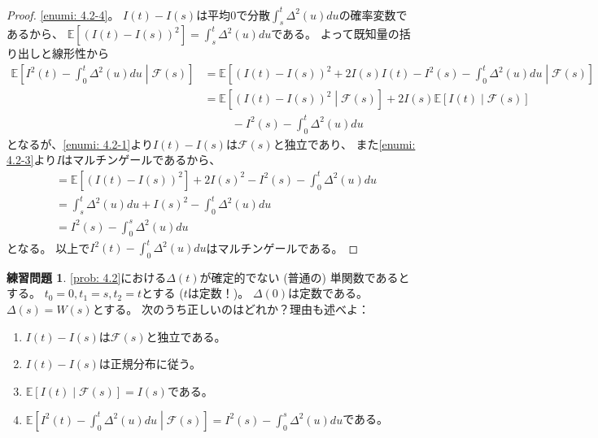 \documentclass[uplatex]{jsarticle}
\theoremstyle{definition}
\newtheorem{prob}[prob]{練習問題}
\def\E{\mathbb{E}}
\def\mcF{\mathcal{F}}
\begin{document}
\begin{proof}
  \ref{enumi: 4.2-4}。
  \(I(t)-I(s)\)は平均\(0\)で分散\(\int_s^t\Delta^2(u)du\)の確率変数であるから、
  \(\E[(I(t)-I(s))^2] = \int_s^t\Delta^2(u)du\)である。
  よって既知量の括り出しと線形性から
  \begin{align*}
    \E \left[ I^2(t) - \int_0^t\Delta^2(u)du \middle| \mcF(s)\right]
    &= \E \left[ (I(t)-I(s))^2 + 2I(s)I(t) - I^2(s) - \int_0^t\Delta^2(u)du \middle| \mcF(s)\right] \\
    &= \E \left[ (I(t)-I(s))^2 \middle| \mcF(s)\right]
    + 2I(s) \E \left[I(t)\middle| \mcF(s)\right] \\
    &\ \ \ \ \ \ \ \ \ \ \ - I^2(s) - \int_0^t\Delta^2(u)du
  \end{align*}
  となるが、\ref{enumi: 4.2-1}より\(I(t)-I(s)\)は\(\mcF(s)\)と独立であり、
  また\ref{enumi: 4.2-3}より\(I\)はマルチンゲールであるから、
  \begin{align*}
    &= \E \left[ (I(t)-I(s))^2\right]
    + 2I(s)^2 - I^2(s) - \int_0^t\Delta^2(u)du \\
    &= \int_s^t\Delta^2(u)du + I(s)^2 - \int_0^t\Delta^2(u)du \\
    &= I^2(s) - \int_0^s\Delta^2(u)du
  \end{align*}
  となる。
  以上で\(I^2(t)-\int_0^t\Delta^2(u)du\)はマルチンゲールである。
\end{proof}




\begin{prob}\label{prob: 4.3}
  \ref{prob: 4.2}における\(\Delta(t)\)が確定的でない (普通の) 単関数であるとする。
  \(t_0=0,t_1=s,t_2=t\)とする (\(t\)は定数！)。
  \(\Delta(0)\)は定数である。
  \(\Delta(s) = W(s)\)とする。
  次のうち正しいのはどれか？理由も述べよ：
  \begin{enumerate}
    \item \label{enumi: 4.3-1}
    \(I(t)-I(s)\)は\(\mcF(s)\)と独立である。
    \item \label{enumi: 4.3-2}
    \(I(t)-I(s)\)は正規分布に従う。
    \item \label{enumi: 4.3-3}
    \(\E\left[I(t)\middle| \mcF(s)\right] = I(s)\)である。
    \item \label{enumi: 4.3-4}
    \(\E\left[ I^2(t) - \int_0^t\Delta^2(u)du \middle| \mcF(s)\right]
    = I^2(s) - \int_0^s\Delta^2(u)du\)である。
  \end{enumerate}
\end{prob}
\end{document}
